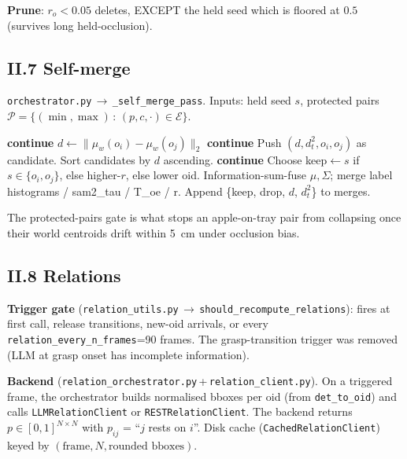 \documentclass[11pt]{article}
\newcommand{\file}[1]{\texttt{#1}}
\begin{document}
\textbf{Prune}: $r_o < 0.05$ deletes, EXCEPT the held seed which is
floored at $0.5$ (survives long held-occlusion).

\subsection*{II.7 Self-merge}

\file{orchestrator.py}\,$\to$\,\texttt{\_self\_merge\_pass}. Inputs:
held seed $s$, protected pairs
$\mathcal{P} = \{(\min,\max)\,:\,(p,c,\cdot)\in\mathcal{E}\}$.

\begin{algorithm}[H]
\caption{Self-merge pass.}
\begin{algorithmic}[1]
   \textbf{continue} \EndIf
  \State $d \gets \|\mu_w(o_i) - \mu_w(o_j)\|_2$
   \textbf{continue} \EndIf
  \State Push $(d, d^2_t, o_i, o_j)$ as candidate.
\EndFor
\State Sort candidates by $d$ ascending.
   \textbf{continue} \EndIf
  \State Choose keep$\gets s$ if $s\in\{o_i,o_j\}$, else higher-$r$, else lower oid.
  \State Information-sum-fuse $\mu, \Sigma$; merge label histograms / sam2\_tau / T\_oe / r.
  \State Append \{keep, drop, $d$, $d^2_t$\} to merges.
\EndFor
\end{algorithmic}
\end{algorithm}
The protected-pairs gate is what stops an apple-on-tray pair from
collapsing once their world centroids drift within 5~cm under
occlusion bias.

\subsection*{II.8 Relations}

\textbf{Trigger gate}
(\file{relation\_utils.py}\,$\to$\,\texttt{should\_recompute\_relations}):
fires at first call, release transitions, new-oid arrivals, or every
\texttt{relation\_every\_n\_frames}=90 frames. The grasp-transition
trigger was removed (LLM at grasp onset has incomplete information).

\textbf{Backend} (\file{relation\_orchestrator.py}\,+\,\file{relation\_client.py}).
On a triggered frame, the orchestrator builds normalised bboxes per
oid (from \texttt{det\_to\_oid}) and calls
\texttt{LLMRelationClient} or \texttt{RESTRelationClient}. The
backend returns $p\in[0,1]^{N\times N}$ with $p_{ij}$ = ``$j$ rests
on $i$''. Disk cache (\texttt{CachedRelationClient}) keyed by
$(\text{frame},N,\text{rounded bboxes})$.
\end{document}
